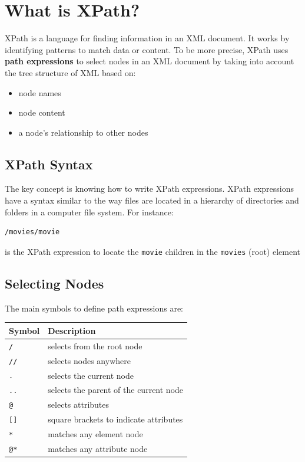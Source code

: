 \documentclass[
]{book}
\begin{document}
\hypertarget{what-is-xpath}{%
\section{What is XPath?}\label{what-is-xpath}}

XPath is a language for finding information in an XML document. It works by
identifying patterns to match data or content. To be more precise, XPath uses
\textbf{path expressions} to select nodes in an XML document by taking into account
the tree structure of XML based on:

\begin{itemize}
\item
  node names
\item
  node content
\item
  a node's relationship to other nodes
\end{itemize}

\hypertarget{xpath-syntax}{%
\subsection{XPath Syntax}\label{xpath-syntax}}

The key concept is knowing how to write XPath expressions. XPath expressions
have a syntax similar to the way files are located in a hierarchy of directories
and folders in a computer file system. For instance:

\begin{verbatim}
/movies/movie
\end{verbatim}

is the XPath expression to locate the \texttt{movie} children in the \texttt{movies} (root)
element

\hypertarget{selecting-nodes}{%
\subsection{Selecting Nodes}\label{selecting-nodes}}

The main symbols to define path expressions are:

\begin{longtable}[]{@{}ll@{}}
\toprule\noalign{}
Symbol & Description \\
\midrule\noalign{}
\endhead
\bottomrule\noalign{}
\endlastfoot
\texttt{/} & selects from the root node \\
\texttt{//} & selects nodes anywhere \\
\texttt{.} & selects the current node \\
\texttt{..} & selects the parent of the current node \\
\texttt{@} & selects attributes \\
\texttt{{[}{]}} & square brackets to indicate attributes \\
\texttt{*} & matches any element node \\
\texttt{@*} & matches any attribute node \\
\end{longtable}
\end{document}
